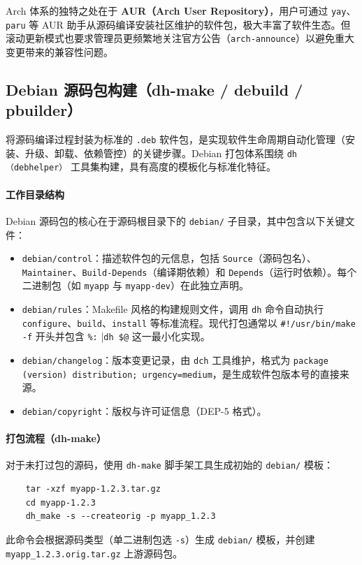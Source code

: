 \documentclass[12pt,UTF8]{ctexbook}
\begin{document}
Arch 体系的独特之处在于 \textbf{AUR（Arch User Repository）}，用户可通过 \texttt{yay}、\texttt{paru} 等 AUR 助手从源码编译安装社区维护的软件包，极大丰富了软件生态。但滚动更新模式也要求管理员更频繁地关注官方公告（\texttt{arch-announce}）以避免重大变更带来的兼容性问题。

\subsection{Debian 源码包构建（dh-make / debuild / pbuilder）}

将源码编译过程封装为标准的 \texttt{.deb} 软件包，是实现软件生命周期自动化管理（安装、升级、卸载、依赖管控）的关键步骤。Debian 打包体系围绕 \texttt{dh（debhelper）} 工具集构建，具有高度的模板化与标准化特征。

\paragraph{工作目录结构}
Debian 源码包的核心在于源码根目录下的 \texttt{debian/} 子目录，其中包含以下关键文件：
\begin{itemize}
	\item \texttt{debian/control}：描述软件包的元信息，包括 \texttt{Source}（源码包名）、\texttt{Maintainer}、\texttt{Build-Depends}（编译期依赖）和 \texttt{Depends}（运行时依赖）。每个二进制包（如 \texttt{myapp} 与 \texttt{myapp-dev}）在此独立声明。
	\item \texttt{debian/rules}：Makefile 风格的构建规则文件，调用 \texttt{dh} 命令自动执行 \texttt{configure}、\texttt{build}、\texttt{install} 等标准流程。现代打包通常以 \verb|#!/usr/bin/make -f| 开头并包含 \verb|%:| |\verb|dh $@| 这一最小化实现。
	\item \texttt{debian/changelog}：版本变更记录，由 \texttt{dch} 工具维护，格式为 \texttt{package (version) distribution; urgency=medium}，是生成软件包版本号的直接来源。
	\item \texttt{debian/copyright}：版权与许可证信息（DEP-5 格式）。
\end{itemize}

\paragraph{打包流程（dh-make）}
对于未打过包的源码，使用 \texttt{dh-make} 脚手架工具生成初始的 \texttt{debian/} 模板：
\begin{verbatim}
	tar -xzf myapp-1.2.3.tar.gz
	cd myapp-1.2.3
	dh_make -s --createorig -p myapp_1.2.3
\end{verbatim}
此命令会根据源码类型（单二进制包选 \texttt{-s}）生成 \texttt{debian/} 模板，并创建 \texttt{myapp\_1.2.3.orig.tar.gz} 上游源码包。
\end{document}
